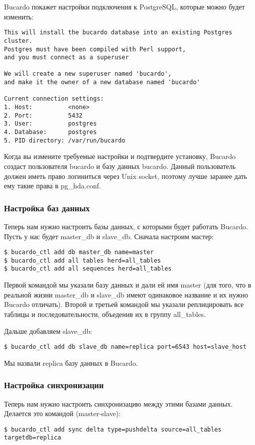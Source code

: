 Bucardo покажет настройки подключения к PostgreSQL, которые можно будет изменить:
\begin{lstlisting}[label=lst:bucardo6,caption=Инициализация Bucardo]
This will install the bucardo database into an existing Postgres cluster.
Postgres must have been compiled with Perl support,
and you must connect as a superuser

We will create a new superuser named 'bucardo',
and make it the owner of a new database named 'bucardo'

Current connection settings:
1. Host:          <none>
2. Port:          5432
3. User:          postgres
4. Database:      postgres
5. PID directory: /var/run/bucardo
\end{lstlisting}

Когда вы измените требуемые настройки и подтвердите установку, Bucardo создаст пользователя bucardo и базу данных bucardo.
Данный пользователь должен иметь право логиниться через Unix socket, поэтому лучше заранее дать ему такие права в pg\_hda.conf.

\subsubsection{Настройка баз данных}
Теперь нам нужно настроить базы данных, с которыми будет работать Bucardo.
Пусть у нас будет master\_db и slave\_db. Сначала настроим мастер:
\begin{lstlisting}[label=lst:bucardo7,caption=Настройка баз данных]
$ bucardo_ctl add db master_db name=master
$ bucardo_ctl add all tables herd=all_tables
$ bucardo_ctl add all sequences herd=all_tables
\end{lstlisting}

Первой командой мы указали базу данных и дали ей имя master (для того, что в реальной жизни master\_db и slave\_db
имеют одинаковое название и их нужно Bucardo отличать). Второй и третьей командой мы указали реплицировать все таблицы и последовательности, объеденив их в группу all\_tables.

Дальше добавляем slave\_db:
\begin{lstlisting}[label=lst:bucardo8,caption=Настройка баз данных]
$ bucardo_ctl add db slave_db name=replica port=6543 host=slave_host
\end{lstlisting}

Мы назвали replica базу данных в Bucardo.

\subsubsection{Настройка синхронизации}
Теперь нам нужно настроить синхронизацию между этими базами данных. Делается это командой (master-slave):
\begin{lstlisting}[label=lst:bucardo9,caption=Настройка синхронизации]
$ bucardo_ctl add sync delta type=pushdelta source=all_tables targetdb=replica
\end{lstlisting}

